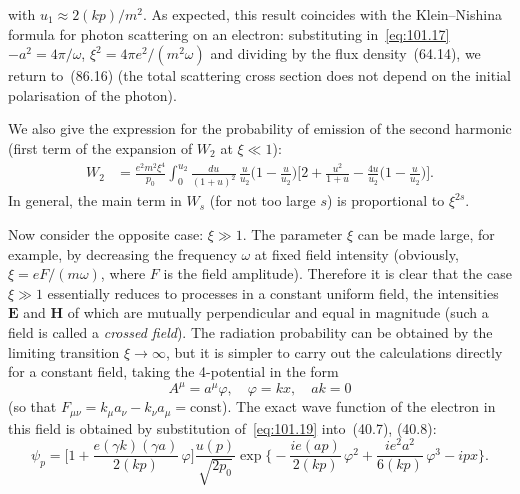 
\noindent with $u_1 \approx 2(kp)/m^2$. As expected, this result coincides with the Klein--Nishina formula for photon scattering on an electron: substituting in~\eqref{eq:101.17} $-a^2 = 4\pi/\omega$, $\xi^2 = 4\pi e^2/(m^2\omega)$ and dividing by the flux density~(64.14), we return to~(86.16) (the total scattering cross section does not depend on the initial polarisation of the photon).

We also give the expression for the probability of emission of the second harmonic (first term of the expansion of $W_2$ at $\xi \ll 1$):
\begin{equation}
\begin{split}
W_2 &= \frac{e^2 m^2 \xi^4}{p_0}\int_0^{u_2}\frac{du}{(1+u)^2}\,\frac{u}{u_2}\biggl(1 - \frac{u}{u_2}\biggr)\biggl[2 + \frac{u^2}{1+u} - \frac{4u}{u_2}\biggl(1 - \frac{u}{u_2}\biggr)\biggr].
\end{split}
\label{eq:101.18}
\end{equation}
In general, the main term in $W_s$ (for not too large $s$) is proportional to $\xi^{2s}$.

Now consider the opposite case: $\xi \gg 1$. The parameter $\xi$ can be made large, for example, by decreasing the frequency $\omega$ at fixed field intensity (obviously, $\xi = eF/(m\omega)$, where $F$ is the field amplitude). Therefore it is clear that the case $\xi \gg 1$ essentially reduces to processes in a constant uniform field, the intensities $\mathbf{E}$ and $\mathbf{H}$ of which are mutually perpendicular and equal in magnitude (such a field is called a \emph{crossed field}). The radiation probability can be obtained by the limiting transition $\xi \to \infty$, but it is simpler to carry out the calculations directly for a constant field, taking the 4-potential in the form
\begin{equation}
A^\mu = a^\mu\varphi, \quad \varphi = kx, \quad ak = 0
\label{eq:101.19}
\end{equation}
(so that $F_{\mu\nu} = k_\mu a_\nu - k_\nu a_\mu = \mathrm{const}$). The exact wave function of the electron in this field is obtained by substitution of~\eqref{eq:101.19} into~(40.7), (40.8):
\begin{equation}
\psi_p = \biggl[1 + \frac{e(\gamma k)(\gamma a)}{2(kp)}\,\varphi\biggr]\frac{u(p)}{\sqrt{2p_0}}\exp\biggl\{-\frac{ie(ap)}{2(kp)}\,\varphi^2 + \frac{ie^2 a^2}{6(kp)}\,\varphi^3 - ipx\biggr\}.
\label{eq:101.20}
\end{equation}

